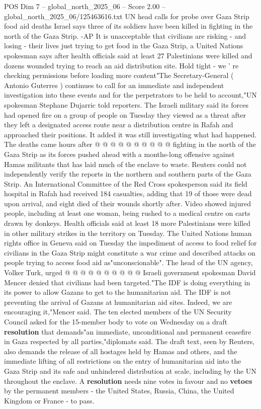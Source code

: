 \begin{textsample}{POS Dim 7 – global\_north\_2025\_06 – Score 2.00 – global\_north\_2025\_06/125463616.txt}  \label{ex:f7_pos_372}
UN head calls for probe over Gaza Strip food aid deaths Israel says three of its soldiers have been killed in fighting in the north of the Gaza Strip. -AP It is unacceptable that civilians are risking - and losing - their lives just trying to get food in the Gaza Strip, a United Nations spokesman says after health officials said at least 27 Palestinians were killed and dozens wounded trying to reach an aid distribution site.
Hold tight - we ' re checking permissions before loading more content"The Secretary-General ( Antonio Guterres ) continues to call for an immediate and independent investigation into these events and for the perpetrators to be held to account,"UN spokesman Stephane Dujarric told reporters.
The Israeli military said its forces had opened fire on a group of people on Tuesday they viewed as a threat after they left a designated access route near a distribution centre in Rafah and approached their positions.
It added it was still investigating what had happened.
The deaths came hours after @ @ @ @ @ @ @ @ @ @ fighting in the north of the Gaza Strip as its forces pushed ahead with a months-long offensive against Hamas militants that has laid much of the enclave to waste.
Reuters could not independently verify the reports in the northern and southern parts of the Gaza Strip.
An International Committee of the Red Cross spokesperson said its field hospital in Rafah had received 184 casualties, adding that 19 of those were dead upon arrival, and eight died of their wounds shortly after.
Video showed injured people, including at least one woman, being rushed to a medical centre on carts drawn by donkeys.
Health officials said at least 18 more Palestinians were killed in other military strikes in the territory on Tuesday.
The United Nations human rights office in Geneva said on Tuesday the impediment of access to food relief for civilians in the Gaza Strip might constitute a war crime and described attacks on people trying to access food aid as"unconscionable".
The head of the UN agency, Volker Turk, urged @ @ @ @ @ @ @ @ @ @ Israeli government spokesman David Mencer denied that civilians had been targeted."The IDF is doing everything in its power to allow Gazans to get to the humanitarian aid.
The IDF is not preventing the arrival of Gazans at humanitarian aid sites.
Indeed, we are encouraging it,"Mencer said.
The ten elected members of the UN Security Council asked for the 15-member body to vote on Wednesday on a draft \textbf{resolution} that demands"an immediate, unconditional and permanent ceasefire in Gaza respected by all parties,"diplomats said.
The draft text, seen by Reuters, also demands the release of all hostages held by Hamas and others, and the immediate lifting of all restrictions on the entry of humanitarian aid into the Gaza Strip and its safe and unhindered distribution at scale, including by the UN throughout the enclave.
A \textbf{resolution} needs nine votes in favour and no \textbf{vetoes} by the permanent members - the United States, Russia, China, the United Kingdom or France - to pass.

\end{textsample}
